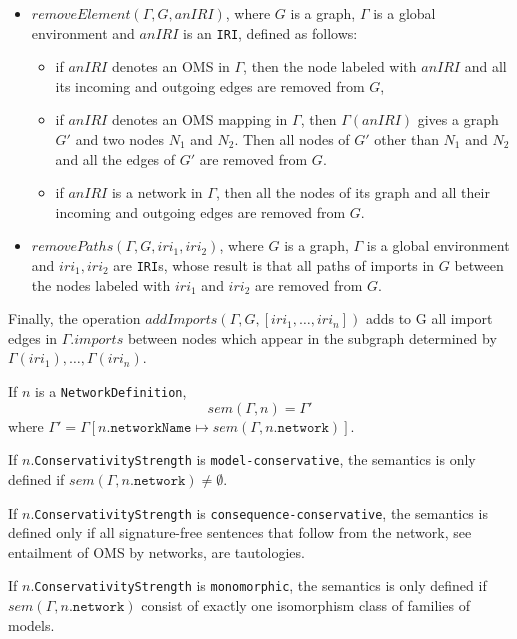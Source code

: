 \documentclass[10pt,fleqn,final]{scrreprt}
\newcommand*{\syntax}[1]{\texttt{#1}}
\newcommand{\semdom}[1]{
\begin{center}
\fbox{$#1$}
\end{center}
}
\newenvironment{definitions}[0]{\medskip }{}
\begin{document}
\begin{definitions}
\begin{itemize}
\item $removeElement(\Gamma, G, anIRI)$, where $G$ is a graph, 
      $\Gamma$ is a global environment and $anIRI$ is an \syntax{IRI},
      defined as follows: 

 \begin{itemize}
    \item if $anIRI$ denotes an OMS in $\Gamma$, 
          then the node labeled with $anIRI$ and all its incoming and outgoing
                edges are removed from $G$,
   \item  if $anIRI$ denotes an OMS mapping in $\Gamma$, then  
   $\Gamma(anIRI)$ gives a graph $G'$ and two nodes 
   $N_1$ and $N_2$. Then all nodes of $G'$ other than $N_1$ and
   $N_2$ and all the edges of $G'$ are removed from $G$.
   \item if $anIRI$ is a network in $\Gamma$, then all the nodes of its graph and all their incoming and outgoing edges are removed 
               from $G$.
 \end{itemize}
 
 \item $removePaths(\Gamma, G, iri_1, iri_2)$, where $G$ is a graph, 
      $\Gamma$ is a global environment and $iri_1, iri_2$ are \syntax{IRI}s,
 whose result is that
 all paths of imports in $G$ between the nodes labeled with 
 $iri_1$ and $iri_2$ are removed from $G$.

\end{itemize}

Finally, the operation $addImports(\Gamma, G, [iri_1, \ldots, iri_n])$ adds to G
all import edges in $\Gamma.imports$ between nodes which appear 
in the subgraph determined by  $\Gamma(iri_1), \ldots, \Gamma(iri_n)$. 


\semdom{sem(\Gamma, \syntax{NetworkDefinition}) = \Gamma'}

If $n$ is a \syntax{NetworkDefinition},
$$sem(\Gamma, n) = \Gamma'$$
\noindent where $\Gamma' = \Gamma[n.\syntax{networkName} \mapsto sem(\Gamma, n.\syntax{network})]$.

If $n.$\syntax{ConservativityStrength} is \syntax{model-conservative}, the semantics is only
defined if $sem(\Gamma,n.\syntax{network})\not=\emptyset$.

If $n.$\syntax{ConservativityStrength} is \syntax{consequence-conservative}, the semantics is 
 defined only if all signature-free sentences that follow from the network, see entailment of OMS by networks, are tautologies.

If $n.$\syntax{ConservativityStrength} is \syntax{monomorphic}, the semantics is only
defined if $sem(\Gamma,n.\syntax{network})$ consist of exactly one isomorphism
class of families of models.


\end{definitions}
\end{document}

